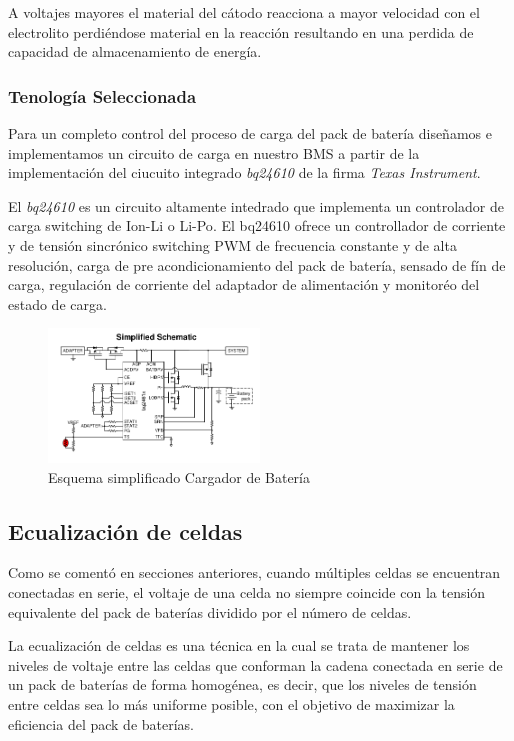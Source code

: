 \documentclass[10pt,a4paper]{article}
\begin{document}
A voltajes mayores el material del cátodo reacciona a mayor velocidad con el
electrolito perdiéndose material en la reacción resultando en una perdida de
capacidad de almacenamiento de energía. 

\subsubsection{Tenología Seleccionada}

Para un completo control del proceso de carga del pack de batería diseñamos e
implementamos un circuito de carga en nuestro \acrshort{BMS} a partir de la
implementación del ciucuito integrado \emph{bq24610} de la firma \emph{Texas
Instrument}.

El \emph{bq24610} es un circuito altamente intedrado que implementa un
controlador  de carga switching de \acrfull{Ion-Li} o \acrfull{Li-Po}. El
bq24610 ofrece un controllador de corriente y de tensión sincrónico switching
PWM de frecuencia constante y de alta resolución, carga de pre acondicionamiento
del pack de batería, sensado de fín de carga, regulación de corriente del
adaptador de alimentación y monitoréo del estado de carga. 

\begin{figure}[h!]
    \centering
    \includegraphics[width=0.5\textwidth]{bat_char/simp_sch_char.png}
    \caption{Esquema simplificado Cargador de Batería}
    \label{fig:simp_sch_char}
\end{figure}
\FloatBarrier

\subsection{Ecualización de celdas}

\noindent Como se comentó en secciones anteriores, cuando múltiples celdas se
encuentran conectadas en serie, el voltaje de una celda no siempre coincide con
la tensión equivalente del pack de baterías dividido por el número de celdas. 

\noindent La ecualización de celdas es una técnica en la cual se trata de
mantener los niveles de voltaje entre las celdas que conforman la cadena
conectada en serie de un pack de baterías de forma homogénea, es decir, que los
niveles de tensión entre celdas sea lo más uniforme posible, con el objetivo de
maximizar la eficiencia del pack de baterías.
\end{document}
